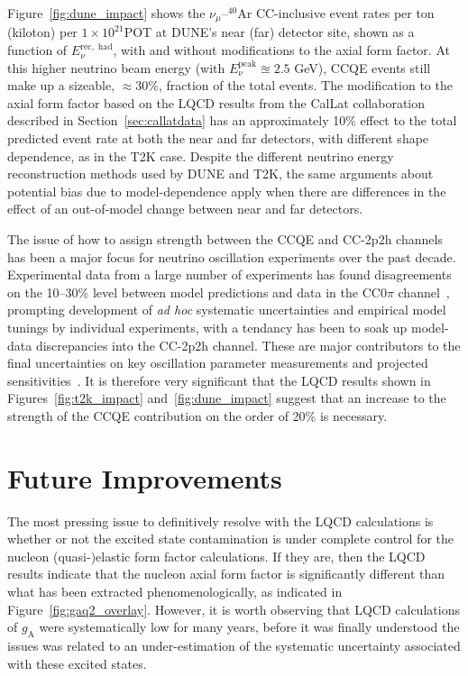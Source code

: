 \documentclass{ar-1col}
\begin{document}
Figure~\ref{fig:dune_impact} shows the $\nu_{\mu}$--$^{40}$Ar CC-inclusive event rates per ton (kiloton) per $1\times10^{21}$POT at DUNE's near (far) detector site, shown as a function of $E^{\mathrm{rec,\;had}}_{\nu}$, with and without modifications to the axial form factor. At this higher neutrino beam energy (with $E_{\nu}^{\mathrm{peak}} \approxeq 2.5$ GeV), CCQE events still make up a sizeable, $\approx$30\%, fraction of the total events. The modification to the axial form factor based on the LQCD results from the CalLat collaboration described in Section~\ref{sec:callatdata} has an approximately 10\% effect to the total predicted event rate at both the near and far detectors, with different shape dependence, as in the T2K case. Despite the different neutrino energy reconstruction methods used by DUNE and T2K, the same arguments about potential bias due to model-dependence apply when there are differences in the effect of an out-of-model change between near and far detectors.

The issue of how to assign strength between the CCQE and CC-2p2h channels has been a major focus for neutrino oscillation experiments over the past decade. Experimental data from a large number of experiments has found disagreements on the 10--30\% level between model predictions and data in the CC$0\pi$ channel~\cite{garvey_review_2014, Mosel:2016cwa, NuSTEC:2017hzk, Katori:2016yel, ParticleDataGroup:2020ssz}, prompting development of {\it ad hoc} systematic uncertainties and empirical model tunings by individual experiments, with a tendancy has been to soak up model-data discrepancies into the CC-2p2h channel. These are major contributors to the final uncertainties on key oscillation parameter measurements and projected sensitivities~\cite{T2K:2019bcf, DUNE:2020jqi, T2K:2021xwb, NOvA:2021nfi, DUNE:2021mtg}. It is therefore very significant that the LQCD results shown in Figures~\ref{fig:t2k_impact} and~\ref{fig:dune_impact} suggest that an increase to the strength of the CCQE contribution on the order of 20\% is necessary.


\section{Future Improvements\label{sec:future}}

The most pressing issue to definitively resolve with the LQCD calculations is whether or not the excited state contamination is under complete control for the nucleon (quasi-)elastic form factor calculations.
If they are, then the LQCD results indicate that the nucleon axial form factor is significantly different than what has been extracted phenomenologically, as indicated in Figure~\ref{fig:gaq2_overlay}.
However, it is worth observing that LQCD calculations of $g_{\mathrm{A}}$ were systematically low for many years, before it was finally understood the issues was related to an under-estimation of the systematic uncertainty associated with these excited states.
\end{document}
